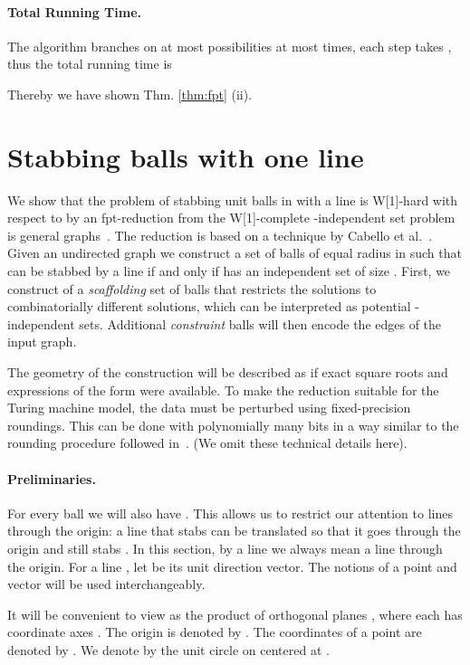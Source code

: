\documentclass[12pt]{article}
\newcommand{\cclass}[1]{{#1}}
\newcommand{\wone}{\cclass{W[1]}}
\begin{document}
\paragraph{Total Running Time.}
The algorithm branches on at most  possibilities at most  times, each step takes , thus the total running time is

Thereby we have shown Thm. \ref{thm:fpt} (ii). 


\section{Stabbing balls with one line}\label{balls_one_line}
We show that the problem of stabbing unit balls in  with a line is \wone-hard with respect to  by an fpt-reduction from 
the \wone-complete -independent set problem is general graphs~\cite{DF99}.
The reduction is based on a technique by Cabello et al.~\cite{CGKR08, cgkmr-gcfpt-09}. 
Given an undirected graph  we construct a set  of 
balls of equal radius  in  such that 
 can be stabbed by a line if and only if  has an independent set of size . First, we construct of a \emph{scaffolding}
set of balls that restricts the solutions to  combinatorially
different solutions, which can be interpreted as potential
-independent sets. Additional \emph{constraint} balls
will then encode the edges of the input graph.

The geometry of the construction
will be described as if
exact square roots and expressions of the form 
were available.  To make the reduction suitable for the Turing machine
model, the data must be perturbed using fixed-precision roundings.  This
can be done with polynomially many bits in a way similar to the
rounding procedure followed in~\cite{CGKR08, cgkmr-gcfpt-09}. (We omit these technical details here).

\paragraph{Preliminaries.}
For every ball  we will also have . This allows us to restrict our attention to lines 
through the origin: a line that stabs  can be translated so that it goes through 
the origin and still stabs . In this section, by a line we always mean a line through the origin. 
For a line , let  be its unit direction vector. 
The notions of a point and vector will be used interchangeably.

It will be convenient to
view  as the product of  orthogonal planes ,
where each  has coordinate axes . The origin is denoted by .
The coordinates of a point  are denoted by .
We denote by  the unit circle on  centered at .
\end{document}
